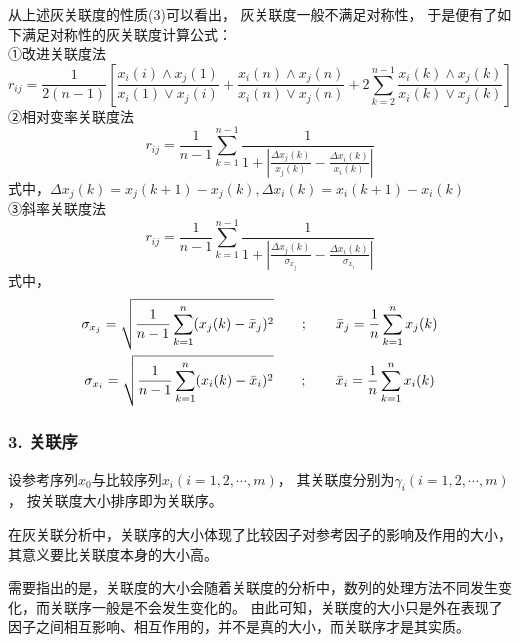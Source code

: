 从上述灰关联度的性质(3)可以看出，
灰关联度一般不满足对称性，
于是便有了如下满足对称性的灰关联度计算公式：\\
①改进关联度法
\begin{equation}
r_{ij}=\frac{1}{2(n-1)} \left[
\frac{x_i(i)\wedge x_j(1)}{x_i(1) \vee x_j(i)}+
\frac{x_i(n)\wedge x_j(n)}{x_i(n) \vee x_j(n)}+
2\sum_{k=2}^{n-1}\frac{x_i(k)\wedge x_j(k)}{x_i(k)\vee x_j(k)}
\right]
\end{equation}
②相对变率关联度法
\begin{equation}
r_{ij}=\frac{1}{n-1}\sum_{k=1}^{n-1} \frac{1}{1+|
\frac{\Delta x_j(k)}{x_j(k)}-\frac{\Delta x_i(k)}{x_i(k)}|}
\end{equation}
式中，$\Delta x_j(k)=x_j(k+1)-x_j(k), \Delta x_i(k)=x_i(k+1)-x_i(k)$ \\
③斜率关联度法
\begin{equation}
r_{ij}=\frac{1}{n-1}\sum_{k=1}^{n-1} \frac{1}{1+|
\frac{\Delta x_j(k)}{\sigma_{x_j}}-\frac{\Delta x_i(k)}{\sigma_{x_i}}|}
\end{equation}
式中，
\begin{gather}
\sigma_{x_j}=\sqrt{\frac{1}{n-1}\sum_{k=1}^{n}(x_j(k)-\bar{x}_j)^2}
\qquad ; \qquad \bar{x}_j=\frac{1}{n} \sum_{k=1}^{n} x_j(k)  \notag \\
\sigma_{x_i}=\sqrt{\frac{1}{n-1}\sum_{k=1}^{n}(x_i(k)-\bar{x}_i)^2}
\qquad ; \qquad \bar{x}_i=\frac{1}{n} \sum_{k=1}^{n} x_i(k)  \notag 
\end{gather}
   
\subsubsection*{3. 关联序}
设参考序列$x_0$与比较序列$x_i (i=1,2,\cdots,m)$，
其关联度分别为$\gamma_i(i=1,2,\cdots,m)$ ，
按关联度大小排序即为关联序。

在灰关联分析中，关联序的大小体现了比较因子对参考因子的影响及作用的大小，其意义要比关联度本身的大小高。

需要指出的是，关联度的大小会随着关联度的分析中，数列的处理方法不同发生变化，而关联序一般是不会发生变化的。
由此可知，关联度的大小只是外在表现了因子之间相互影响、相互作用的，并不是真的大小，而关联序才是其实质。

